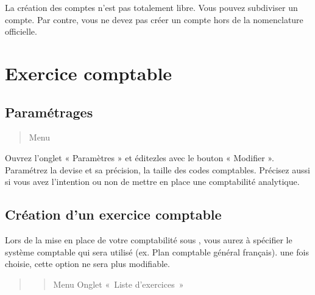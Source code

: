 \documentclass[a4paper,10pt,oneside,french]{sphinxmanual}
\begin{document}
La création des comptes n’est pas totalement libre. Vous pouvez subdiviser un compte. Par contre, vous ne devez pas créer un compte hors de la nomenclature officielle.


\section{Exercice comptable}
\label{\detokenize{accounting/fiscalyear:exercice-comptable}}\label{\detokenize{accounting/fiscalyear::doc}}

\subsection{Paramétrages}
\label{\detokenize{accounting/fiscalyear:parametrages}}\begin{quote}

Menu 
\end{quote}

Ouvrez l’onglet « Paramètres » et éditez\sphinxhyphen{}les avec le bouton « Modifier ». Paramétrez la devise et sa précision, la taille des codes comptables. Précisez aussi si vous avez l’intention ou non de mettre en place une comptabilité analytique.
\begin{quote}

\noindent{}
\end{quote}


\subsection{Création d’un exercice comptable}
\label{\detokenize{accounting/fiscalyear:creation-d-un-exercice-comptable}}
Lors de la mise en place de votre comptabilité sous , vous aurez à spécifier le système comptable qui sera utilisé (ex. Plan comptable général français).  une fois choisie, cette option ne sera plus modifiable.
\begin{quote}
\begin{quote}

Menu  \sphinxhyphen{} Onglet « Liste d’exercices »
\end{quote}

\noindent{}
\end{quote}
\end{document}
